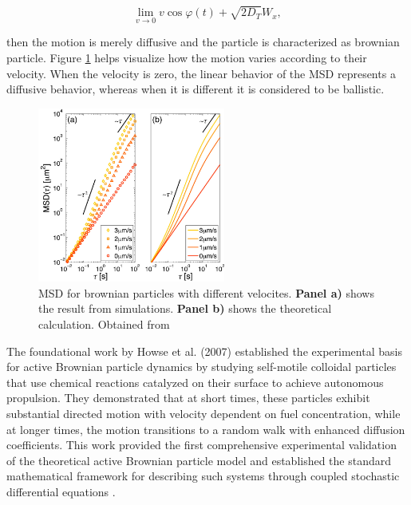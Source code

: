 \begin{equation}
  \lim_{v \to 0}  v\cos{\varphi(t)} + \sqrt{2D_T}W_x,
  \label{eq:limitofvelocity}
\end{equation}

then the motion is merely diffusive and the particle is characterized as brownian particle. Figure \ref{fig:msddifferentvelocities} helps visualize how  the motion varies according to their velocity. When the velocity is zero, the linear behavior of the MSD represents a diffusive behavior, whereas when it is different it is considered to be ballistic. 

\begin{figure}
  \begin{center}
    \includegraphics[width=0.55\textwidth]{figures/msddifferentvelocities.png}
  \end{center}
  \caption[MSD for passive and active brownian particles]{MSD for brownian particles with different velocites. \textbf{Panel a)} shows the result from simulations. \textbf{Panel b)} shows the theoretical calculation. Obtained from \cite{volpe2014simulation}}\label{fig:msddifferentvelocities}
\end{figure}


The foundational work by Howse et al. (2007) established the experimental basis for active Brownian particle dynamics by studying self-motile colloidal particles that use chemical reactions catalyzed on their surface to achieve autonomous propulsion. They demonstrated that at short times, these particles exhibit substantial directed motion with velocity dependent on fuel concentration, while at longer times, the motion transitions to a random walk with enhanced diffusion coefficients. This work provided the first comprehensive experimental validation of the theoretical active Brownian particle model and established the standard mathematical framework for describing such systems through coupled stochastic differential equations \cite{howse2007self}.


